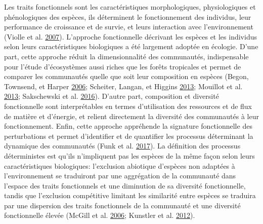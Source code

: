 \documentclass[11pt,french,A4paper,extrafontsizes,onecolumn,openright]{memoir}
\begin{document}
Les traits fonctionnels sont les caractéristiques morphologiques,
physiologiques et phénologiques des espèces, ils déterminent le
fonctionnement des individus, leur performance de croissance et de
survie, et leurs interaction avec l'environnement (Violle et al.
\protect\hyperlink{ref-Violle2007b}{2007}). L'approche fonctionnelle
décrivant les espèces et les individus selon leurs caractéristiques
biologiques a été largement adoptée en écologie. D'une part, cette
approche réduit la dimensionnalité des communautés, indispensable pour
l'étude d'écosystèmes aussi riches que les forêts tropicales et permet
de comparer les communautés quelle que soit leur composition en espèces
(Begon, Townsend, et Harper \protect\hyperlink{ref-Begon2006}{2006};
Scheiter, Langan, et Higgins \protect\hyperlink{ref-Scheiter2013}{2013};
Mouillot et al. \protect\hyperlink{ref-Mouillot2013a}{2013}; Sakschewski
et al. \protect\hyperlink{ref-Sakschewski2016}{2016}). D'autre part,
composition et diversité fonctionnelle sont interprétables en termes
d'utilisation des ressources et de flux de matière et d'énergie, et
relient directement la diversité des communautés à leur fonctionnement.
Enfin, cette approche appréhende la signature fonctionnelle des
perturbations et permet d'identifier et de quantifier les processus
déterminant la dynamique des communautés (Funk et al.
\protect\hyperlink{ref-Funk2017}{2017}). La définition des processus
déterministes est qu'ils n'impliquent pas les espèces de la même façon
selon leurs caractéristiques biologiques: l'exclusion abiotique
d'espèces non adaptées à l'environnement se traduiront par une
aggrégation de la communauté dans l'espace des traits fonctionnels et
une diminution de sa diversité fonctionnelle, tandis que l'exclusion
compétitive limitant les similarité entre espèces se traduira par une
dispersion des traits fonctionnels de la communauté et une diversité
fonctionnelle élevée (McGill et al.
\protect\hyperlink{ref-McGill2006}{2006}; Kunstler et al.
\protect\hyperlink{ref-Kunstler2012}{2012}).
\end{document}
